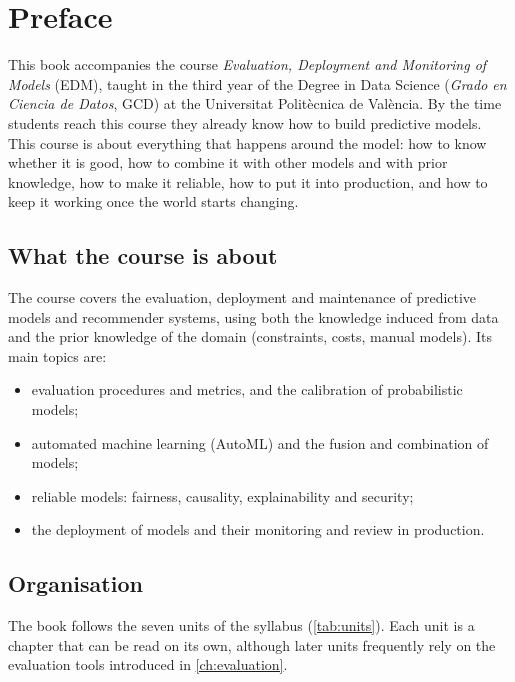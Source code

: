 \chapter*{Preface}

This book accompanies the course \emph{Evaluation, Deployment and Monitoring of Models}
(EDM), taught in the third year of the Degree in Data Science (\emph{Grado en Ciencia de
Datos}, GCD) at the Universitat Polit\`ecnica de Val\`encia. By the time students reach
this course they already know how to build predictive models. This course is about
everything that happens around the model: how to know whether it is good, how to combine
it with other models and with prior knowledge, how to make it reliable, how to put it into
production, and how to keep it working once the world starts changing.

\section*{What the course is about}

The course covers the evaluation, deployment and maintenance of predictive models and
recommender systems, using both the knowledge induced from data and the prior
knowledge of the domain (constraints, costs, manual models). Its main topics are:
\begin{itemize}
  \item evaluation procedures and metrics, and the calibration of probabilistic models;
  \item automated machine learning (AutoML) and the fusion and combination of models;
  \item reliable models: fairness, causality, explainability and security;
  \item the deployment of models and their monitoring and review in production.
\end{itemize}

\section*{Organisation}

The book follows the seven units of the syllabus (\cref{tab:units}). Each unit is a chapter
that can be read on its own, although later units frequently rely on the evaluation tools
introduced in \cref{ch:evaluation}.

